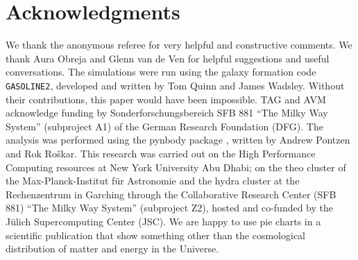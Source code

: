 \documentclass[useAMS,usenatbib]{mnras}
\begin{document}
\section*{Acknowledgments} 
We thank the anonymous referee for very helpful and constructive comments.
We thank Aura Obreja and Glenn van de Ven
for helpful suggestions and useful conversations.
%
The simulations were run using the galaxy formation code
\texttt{GASOLINE2}, developed and written by Tom Quinn and James
Wadsley.  Without their contributions, this paper would have been
impossible.
%
TAG and AVM acknowledge funding by Sonderforschungsbereich SFB
881 ``The Milky Way System'' (subproject A1) of the German Research
Foundation (DFG).
%
The analysis was performed using the pynbody package
\citep[http://pynbody.github.io/,][]{Pontzen2013}, written by Andrew
Pontzen and Rok Ro\v{s}kar. 
%
This research was carried out on the High Performance Computing resources at New York University Abu Dhabi;
on  the {\sc theo} cluster of the
Max-Planck-Institut f\"{u}r Astronomie and the {\sc hydra} cluster at
the Rechenzentrum in Garching through the Collaborative Research
Center (SFB 881) ``The Milky Way System'' (subproject Z2),  hosted and
co-funded by the J\"{u}lich Supercomputing Center (JSC).
%
We are happy to use pie charts in a scientific publication that show
something other than the cosmological distribution of matter and
energy in the Universe.


\balance




\appendix

\bsp

\label{lastpage}
\end{document}
